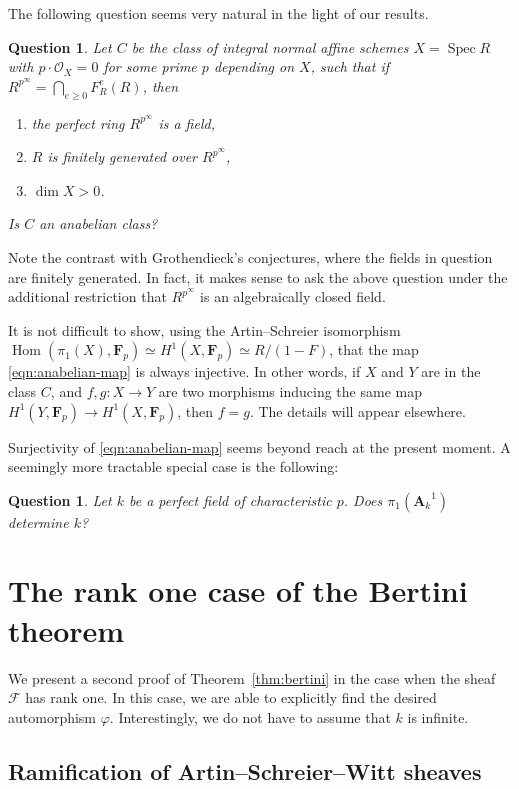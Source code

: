 \documentclass[twoside]{amsart}
\renewcommand{\AA}{\mathbf{A}}
\newcommand{\FF}{\mathbf{F}}
\newcommand{\Ff}{\mathscr{F}}
\newcommand{\Oo}{\mathscr{O}}
\DeclareMathOperator{\Spec}{Spec}
\DeclareMathOperator{\Hom}{Hom}
\newcommand{\ANK}[2]{{\AA_{#2}}^{\! \! \! \!  #1}} %
\newcommand{\AN}[1]{\ANK{#1}{k}}
\newcommand{\isom}{\simeq}
\renewcommand{\phi}{\varphi}
\renewcommand{\to}{\longrightarrow}
\theoremstyle{plain}
\newtheorem{question}[subsubsection]{Question}
\theoremstyle{definition}
\theoremstyle{remark}
\numberwithin{equation}{subsection}
\begin{document}
The following question seems very natural in the light of our results.

\begin{question}
	Let $C$ be the class of integral normal affine schemes $X=\Spec R$ with $p\cdot \Oo_X = 0$ for some prime $p$ depending on $X$, such that if $R^{p^\infty} = \bigcap_{e\geq 0} F_R^e(R)$, then
	\begin{enumerate}[(1)]
		\item the perfect ring $R^{p^\infty}$ is a field,
		\item $R$ is finitely generated over $R^{p^\infty}$,
		\item $\dim X > 0$. 
	\end{enumerate}
	Is $C$ an anabelian class?
\end{question}

Note the contrast with Grothendieck's conjectures, where the fields in question are finitely generated. In fact, it makes sense to ask the above question under the additional restriction that $R^{p^\infty}$ is an algebraically closed field.

It is not difficult to show, using the Artin--Schreier isomorphism $\Hom(\pi_1(X), \FF_p)\isom H^1(X, \FF_p) \isom R/(1-F)$, that the map \eqref{eqn:anabelian-map} is always injective. In other words, if $X$ and $Y$ are in the class $C$, and $f, g\colon X\to Y$ are two morphisms inducing the same map $H^1(Y, \FF_p)\to H^1(X, \FF_p)$, then $f=g$. The details will appear elsewhere.

Surjectivity of \eqref{eqn:anabelian-map} seems beyond reach at the present moment. A seemingly more tractable special case is the following:

\begin{question}
 	Let $k$ be a perfect field of characteristic $p$. Does $\pi_1(\AN 1)$ determine $k$? 
\end{question} 

\appendix

\section{The rank one case of the Bertini theorem} 
\label{s:appendix}

We present a second proof of Theorem~\ref{thm:bertini} in the case when the sheaf $\Ff$ has rank one. In this case, we are able to explicitly find the desired automorphism $\phi$. Interestingly, we do not have to assume that $k$ is infinite.

\subsection{Ramification of Artin--Schreier--Witt sheaves}
\end{document}
